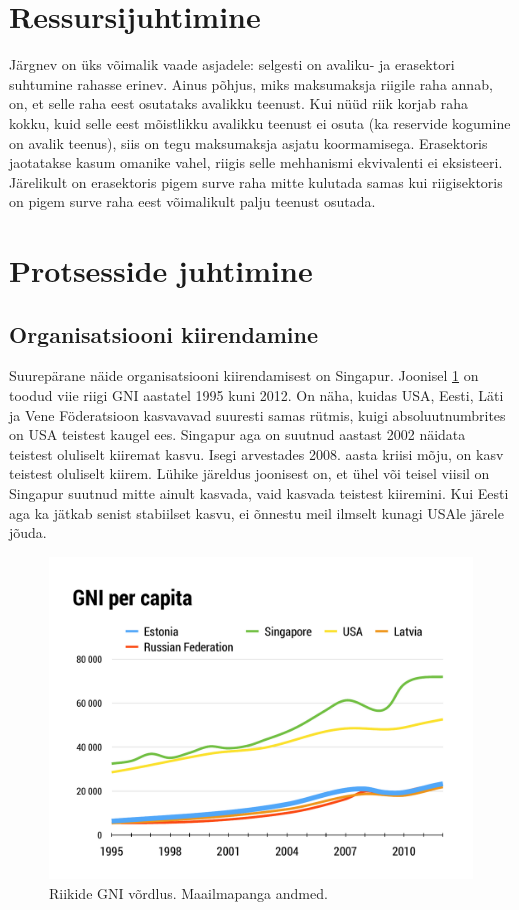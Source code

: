 \documentclass{tufte-book}
\begin{document}
\section{Ressursijuhtimine}
Järgnev on üks võimalik vaade asjadele: selgesti on avaliku- ja erasektori suhtumine rahasse erinev. Ainus põhjus, miks maksumaksja riigile raha annab, on, et selle raha eest osutataks avalikku teenust. Kui nüüd riik korjab raha kokku, kuid selle eest mõistlikku avalikku teenust ei osuta (ka reservide kogumine on avalik teenus), siis on tegu maksumaksja asjatu koormamisega. Erasektoris jaotatakse kasum omanike vahel, riigis selle mehhanismi ekvivalenti ei eksisteeri. Järelikult on erasektoris pigem surve raha mitte kulutada samas kui riigisektoris on pigem surve raha eest võimalikult palju teenust osutada.  

\section{Protsesside juhtimine}
\subsection{Organisatsiooni kiirendamine}
Suurepärane näide organisatsiooni kiirendamisest on Singapur. Joonisel \ref{fig:kasv} on toodud viie riigi GNI aastatel 1995 kuni 2012. On näha, kuidas USA, Eesti, Läti ja Vene Föderatsioon kasvavavad suuresti samas rütmis, kuigi absoluutnumbrites on USA teistest kaugel ees. Singapur aga on suutnud aastast 2002 näidata teistest oluliselt kiiremat kasvu. Isegi arvestades 2008. aasta kriisi mõju, on kasv teistest oluliselt kiirem. Lühike järeldus joonisest on, et ühel või teisel viisil on Singapur suutnud mitte ainult kasvada, vaid kasvada teistest kiiremini. Kui Eesti aga ka jätkab senist stabiilset kasvu, ei õnnestu meil ilmselt kunagi USAle järele jõuda. 

\begin{figure}[h]
	\begin{center}
		\includegraphics[width=\textwidth]{kasv.pdf}
		\caption{Riikide GNI võrdlus. Maailmapanga andmed.}
		\label{fig:kasv}
	\end{center}
\end{figure}
\end{document}
